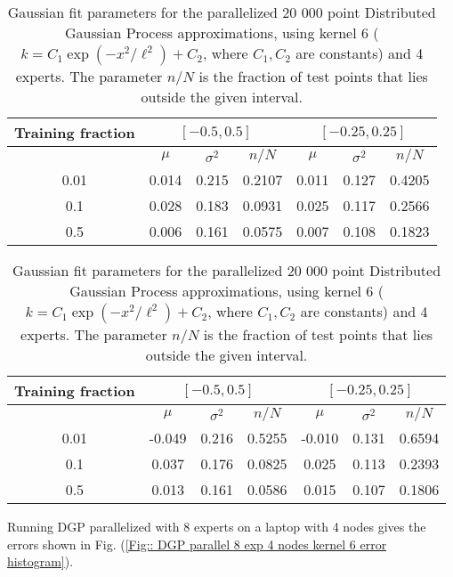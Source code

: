 \documentclass[twoside,english]{uiofysmaster}
\begin{document}
\begin{table}
\centering
\begin{tabular}{ccccccc}
\toprule
Training fraction &  \multicolumn{3}{c}{$[-0.5, 0.5]$} & \multicolumn{3}{c}{$[-0.25,0.25]$}\\
\midrule
{}  & $\mu$ & $\sigma^2$ & $n/N$ & $\mu$ & $\sigma^2$ & $n/N$\\
0.01 & 0.014 & 0.215 & 0.2107 & 0.011 & 0.127 & 0.4205\\
0.1 & 0.028 & 0.183 & 0.0931 & 0.025 & 0.117 & 0.2566\\
0.5 & 0.006 & 0.161 & 0.0575 & 0.007 & 0.108 & 0.1823\\
\bottomrule
\end{tabular}
\caption{Gaussian fit parameters for the parallelized 20 000 point Distributed Gaussian Process approximations, using kernel 6 ($k = C_1 \exp (-x^2/\ell^2) + C_2$, where $C_1, C_2$ are constants) and 4 experts. The parameter $n/N$ is the fraction of test points that lies outside the given interval.}
\label{Tab:: DGP parallel 20k 4 experts comparison of training fractions k6}
\end{table}

\begin{table}
\centering
\begin{tabular}{ccccccc}
\toprule
Training fraction &  \multicolumn{3}{c}{$[-0.5, 0.5]$} & \multicolumn{3}{c}{$[-0.25,0.25]$}\\
\midrule
{}  & $\mu$ & $\sigma^2$ & $n/N$ & $\mu$ & $\sigma^2$ & $n/N$\\
0.01 & -0.049 & 0.216 & 0.5255 & -0.010 & 0.131 & 0.6594\\
0.1 & 0.037 & 0.176 & 0.0825 & 0.025 & 0.113 & 0.2393\\
0.5 & 0.013 & 0.161 & 0.0586 & 0.015 & 0.107 & 0.1806\\
\bottomrule
\end{tabular}
\caption{Gaussian fit parameters for the parallelized 20 000 point Distributed Gaussian Process approximations, using kernel 6 ($k = C_1 \exp (-x^2/\ell^2) + C_2$, where $C_1, C_2$ are constants) and 4 experts. The parameter $n/N$ is the fraction of test points that lies outside the given interval.}
\label{Tab:: DGP parallel 20k 8 experts comparison of training fractions k6}
\end{table}

Running DGP parallelized with 8 experts on a laptop with 4 nodes gives the errors shown in Fig. (\ref{Fig:: DGP parallel 8 exp 4 nodes kernel 6 error histogram}).
\end{document}
